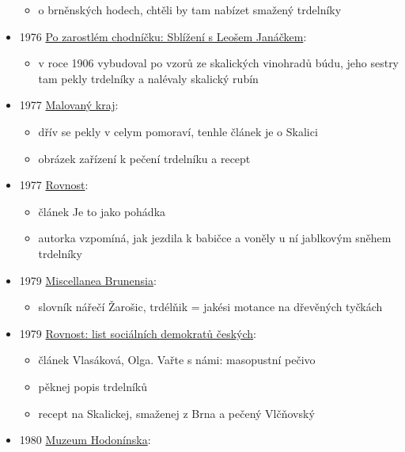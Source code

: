 \begin{itemize}
  \begin{itemize}
  \tightlist
  \item
    o brněnských hodech, chtěli by tam nabízet smažený trdelníky
  \end{itemize}
\item
  1976
  \href{https://ceskadigitalniknihovna.cz/uuid/uuid:16272350-bc77-11e2-b6da-005056827e52}{Po
  zarostlém chodníčku: Sblížení s Leošem Janáčkem}:

  \begin{itemize}
  \tightlist
  \item
    v roce 1906 vybudoval po vzorů ze skalických vinohradů búdu, jeho
    sestry tam pekly trdelníky a nalévaly skalický rubín
  \end{itemize}
\item
  1977
  \href{https://ndk.cz/uuid/uuid:84ffac90-ec3f-11e3-97c9-001018b5eb5c}{Malovaný
  kraj}:

  \begin{itemize}
  \tightlist
  \item
    dřív se pekly v celym pomoraví, tenhle článek je o Skalici
  \item
    obrázek zařízení k pečení trdelníku a recept
  \end{itemize}
\item
  1977
  \href{https://ceskadigitalniknihovna.cz/uuid/uuid:287f33fd-b113-44e3-b64c-9c82f3afa022}{Rovnost}:

  \begin{itemize}
  \tightlist
  \item
    článek Je to jako pohádka
  \item
    autorka vzpomíná, jak jezdila k babičce a voněly u ní jablkovým
    sněhem trdelníky
  \end{itemize}
\item
  1979
  \href{https://ceskadigitalniknihovna.cz/view/uuid:be7361f0-4ec5-11ed-8291-5ef3fc9bb22f?page=uuid\%3A7ae36698-432f-4b36-b735-c85727b4d482&source=nkp}{Miscellanea
  Brunensia}:

  \begin{itemize}
  \tightlist
  \item
    slovník nářečí Žarošic, trdélňik = jakési motance na dřevěných
    tyčkách
  \end{itemize}
\item
  1979
  \href{https://ceskadigitalniknihovna.cz/uuid/uuid:15aadd4e-cf35-4c33-afac-de13c4594761}{Rovnost:
  list sociálních demokratů českých}:

  \begin{itemize}
  \tightlist
  \item
    článek Vlasáková, Olga. Vařte s námi: masopustní pečivo
  \item
    pěknej popis trdelníků
  \item
    recept na Skalickej, smaženej z Brna a pečený Vlčňovský
  \end{itemize}
\item
  1980
  \href{https://ceskadigitalniknihovna.cz/uuid/uuid:c9416770-a264-41ee-9b5f-6d74a6a748aa}{Muzeum
  Hodonínska}:


\end{itemize}
